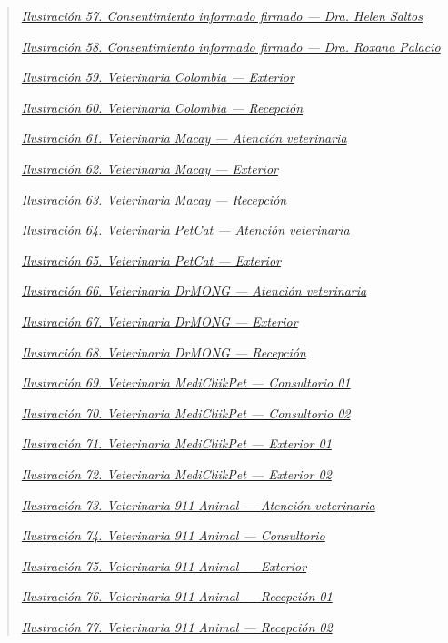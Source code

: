 \documentclass[
]{article}
\begin{document}
\begin{quote}
\hyperref[consentimiento-helen-saltos]{\emph{Ilustración 57. Consentimiento informado firmado --- Dra. Helen Saltos}}

\hyperref[consentimiento-roxana-palacio]{\emph{Ilustración 58. Consentimiento informado firmado --- Dra. Roxana Palacio}}

\hyperref[foto-colombia-exterior]{\emph{Ilustración 59. Veterinaria Colombia --- Exterior}}

\hyperref[foto-colombia-recepcion]{\emph{Ilustración 60. Veterinaria Colombia --- Recepción}}

\hyperref[foto-macay-atencion]{\emph{Ilustración 61. Veterinaria Macay --- Atención veterinaria}}

\hyperref[foto-macay-exterior]{\emph{Ilustración 62. Veterinaria Macay --- Exterior}}

\hyperref[foto-macay-recepcion]{\emph{Ilustración 63. Veterinaria Macay --- Recepción}}

\hyperref[foto-petcat-atencion]{\emph{Ilustración 64. Veterinaria PetCat --- Atención veterinaria}}

\hyperref[foto-petcat-exterior]{\emph{Ilustración 65. Veterinaria PetCat --- Exterior}}

\hyperref[foto-drmong-atencion]{\emph{Ilustración 66. Veterinaria DrMONG --- Atención veterinaria}}

\hyperref[foto-drmong-exterior]{\emph{Ilustración 67. Veterinaria DrMONG --- Exterior}}

\hyperref[foto-drmong-recepcion]{\emph{Ilustración 68. Veterinaria DrMONG --- Recepción}}

\hyperref[foto-medicliikpet-consultorio1]{\emph{Ilustración 69. Veterinaria MediCliikPet --- Consultorio 01}}

\hyperref[foto-medicliikpet-consultorio2]{\emph{Ilustración 70. Veterinaria MediCliikPet --- Consultorio 02}}

\hyperref[foto-medicliikpet-exterior1]{\emph{Ilustración 71. Veterinaria MediCliikPet --- Exterior 01}}

\hyperref[foto-medicliikpet-exterior2]{\emph{Ilustración 72. Veterinaria MediCliikPet --- Exterior 02}}

\hyperref[foto-911animal-atencion]{\emph{Ilustración 73. Veterinaria 911 Animal --- Atención veterinaria}}

\hyperref[foto-911animal-consultorio]{\emph{Ilustración 74. Veterinaria 911 Animal --- Consultorio}}

\hyperref[foto-911animal-exterior]{\emph{Ilustración 75. Veterinaria 911 Animal --- Exterior}}

\hyperref[foto-911animal-recepcion1]{\emph{Ilustración 76. Veterinaria 911 Animal --- Recepción 01}}

\hyperref[foto-911animal-recepcion2]{\emph{Ilustración 77. Veterinaria 911 Animal --- Recepción 02}}

\end{quote}
\end{document}

